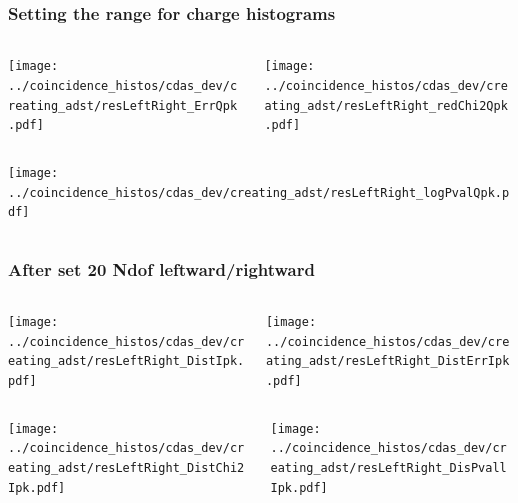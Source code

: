 \documentclass[aspectratio=169]{beamer}
\begin{document}
\begin{frame}
  \frametitle{Setting the range for charge histograms}

  \begin{columns}
    \centering
    \begin{column}{0.5\textwidth}
      \texttt{[image: ../coincidence\_histos/cdas\_dev/creating\_adst/resLeftRight\_ErrQpk.pdf]}
    \end{column}
    \begin{column}{0.5\textwidth}
      \texttt{[image: ../coincidence\_histos/cdas\_dev/creating\_adst/resLeftRight\_redChi2Qpk.pdf]}
    \end{column}
  \end{columns}

  \begin{columns}
    \centering
    \begin{column}{0.5\textwidth}
      \texttt{[image: ../coincidence\_histos/cdas\_dev/creating\_adst/resLeftRight\_logPvalQpk.pdf]}
    \end{column}
  \end{columns}
\end{frame}

\begin{frame}
  \frametitle{After set 20 Ndof leftward/rightward} 
  
  \begin{columns}
    \centering
    \begin{column}{0.5\textwidth}
      \texttt{[image: ../coincidence\_histos/cdas\_dev/creating\_adst/resLeftRight\_DistIpk.pdf]}
    \end{column}
    \begin{column}{0.5\textwidth}
      \texttt{[image: ../coincidence\_histos/cdas\_dev/creating\_adst/resLeftRight\_DistErrIpk.pdf]}
    \end{column}
  \end{columns}

  \begin{columns}
    \centering
    \begin{column}{0.5\textwidth}
      \texttt{[image: ../coincidence\_histos/cdas\_dev/creating\_adst/resLeftRight\_DistChi2Ipk.pdf]}
    \end{column}
    \begin{column}{0.5\textwidth}
      \texttt{[image: ../coincidence\_histos/cdas\_dev/creating\_adst/resLeftRight\_DisPvallIpk.pdf]}
    \end{column}
  \end{columns}
\end{frame}
\end{document}
